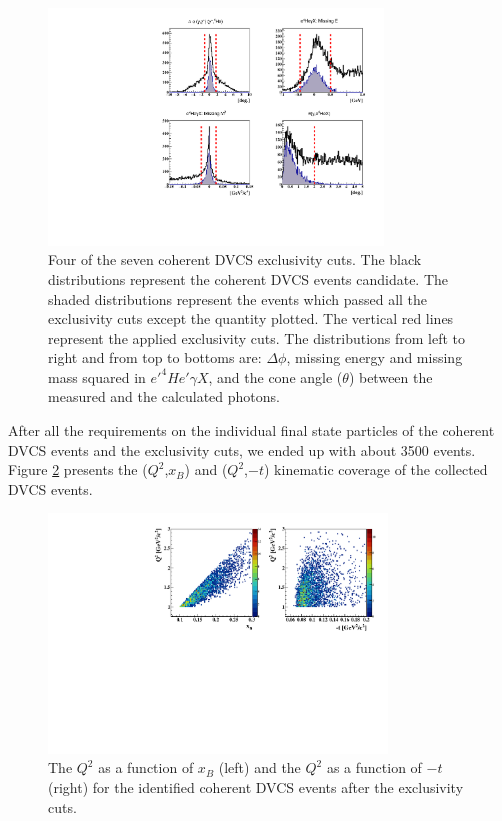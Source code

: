 \documentclass[nofootinbib,twocolumn,showpacs,prl,superscriptaddress,secnumarabic,amssymb,nobibnotes,aps,floatfix]{revtex4}
\begin{document}
\begin{figure}[tb]
\includegraphics[width=8.9cm]{figs/coh_exc_cuts.pdf}
\caption{Four of the seven coherent DVCS exclusivity cuts. The black 
distributions represent the coherent DVCS events candidate. The shaded 
distributions represent the events which passed all the exclusivity cuts except 
the quantity plotted. The vertical red lines represent the applied exclusivity 
cuts. The distributions from left to right and from top to bottoms are: $\Delta 
\phi$, missing energy and missing mass squared in $e'^4He'\gamma X$, and the 
cone angle ($\theta$) between the measured and the calculated photons.}
\label{fig:kin-cuts}
\end{figure}
After all the requirements on the individual final state particles of the 
coherent DVCS events and the exclusivity cuts, we ended up with about 3500 
events. Figure \ref{fig:kin-coverage} presents the ($Q^{2}$,$x_{B}$) and 
($Q^{2}$,$-t$) kinematic coverage of the collected DVCS events. 

\begin{figure}[tb]
\hspace{-0.45cm}
\includegraphics[width=9.0cm]{figs/Q2_xB_t_Coh.pdf}
\caption{The $Q^{2}$ as a function of $x_{B}$ (left) and the $Q^{2}$ as a 
function of $-t$ (right) for the identified coherent DVCS events after the 
exclusivity cuts.}
\label{fig:kin-coverage}
\end{figure}
\end{document}
